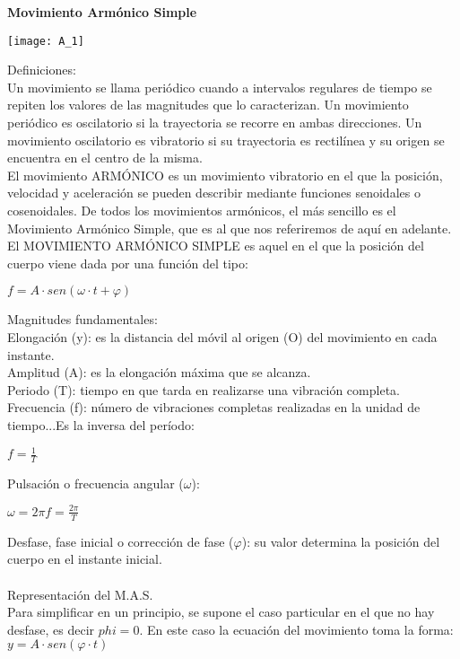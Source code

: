 \documentclass[11pt,a4paper]{article}
\newenvironment{Figuras}
  {\par\medskip\noindent\minipage{\linewidth}}
  {\endminipage\par\medskip}
\begin{document}
\begin{multicols}{2}
\textbf{Movimiento Armónico Simple}\\

\begin{Figuras}
	\centering
    \texttt{[image: A\_1]}
    \label{fig:mesh1}
\end{Figuras}

Definiciones:\\ 
Un movimiento se llama periódico cuando a intervalos regulares de tiempo se repiten los valores de las magnitudes que lo caracterizan. Un movimiento periódico es oscilatorio si la trayectoria se recorre en ambas direcciones. Un movimiento oscilatorio es vibratorio si su trayectoria es rectilínea y su origen se encuentra en el centro de la misma.\\El movimiento ARMÓNICO es un movimiento vibratorio en el que la posición, velocidad y aceleración se pueden describir mediante funciones senoidales o cosenoidales. De todos los movimientos armónicos, el más sencillo es el Movimiento Armónico Simple, que es al que nos referiremos de aquí en adelante. \\El MOVIMIENTO ARMÓNICO SIMPLE es aquel en el que la posición del cuerpo viene dada por una función del tipo:\begin{center}
$f=A\cdot sen(\omega \cdot t + \varphi) $\end{center}Magnitudes fundamentales:\\Elongación (y): es la distancia del móvil al origen (O) del movimiento en cada instante.\\Amplitud (A): es la elongación máxima que se alcanza.\\Periodo (T): tiempo en que tarda en realizarse una vibración completa.\\Frecuencia (f): número de vibraciones completas realizadas en la unidad de 
tiempo...Es la inversa del período:\begin{center}
$f=\frac{1}{T}$
\end{center}
Pulsación o frecuencia angular ($\omega$):
\begin{center}
$\omega=2\pi f=\frac{2\pi}{T}$
\end{center}
Desfase, fase inicial o corrección de fase ($\varphi$): su valor determina la posición del cuerpo en el instante inicial. \\\\
Representación del M.A.S.\\

Para simplificar en un principio, se supone el caso particular en el que no hay desfase, es decir $phi=0$. En este caso la ecuación del movimiento toma la forma: 
$y= A \cdot sen (\varphi \cdot t)$\\


\end{multicols}
\end{document}
